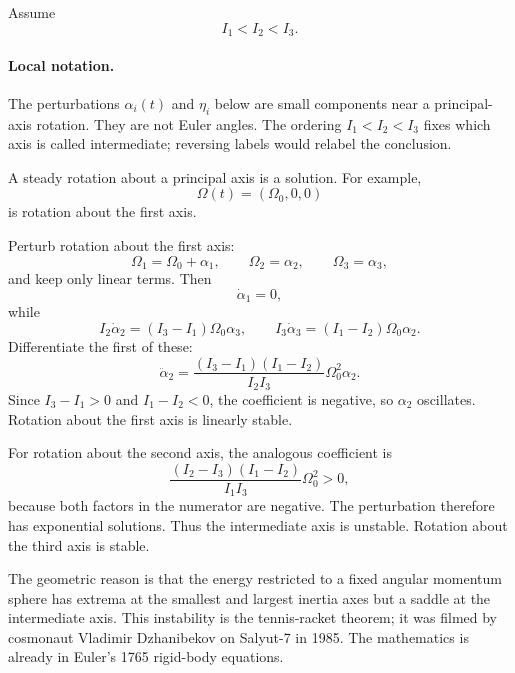 Assume
\[
  I_1<I_2<I_3.
\]

\paragraph{Local notation.}
The perturbations \(\alpha_i(t)\) and \(\eta_i\) below are small components
near a principal-axis rotation.  They are not Euler angles.  The ordering
\(I_1<I_2<I_3\) fixes which axis is called intermediate; reversing labels
would relabel the conclusion.

A steady rotation about a principal axis is a solution. For example,
\[
  \Omega(t)=(\Omega_0,0,0)
\]
is rotation about the first axis.

\begin{derivation}
Perturb rotation about the first axis:
\[
  \Omega_1=\Omega_0+\alpha_1,\qquad
  \Omega_2=\alpha_2,\qquad
  \Omega_3=\alpha_3,
\]
and keep only linear terms. Then
\[
  \dot\alpha_1=0,
\]
while
\[
  I_2\dot\alpha_2=(I_3-I_1)\Omega_0\alpha_3,
  \qquad
  I_3\dot\alpha_3=(I_1-I_2)\Omega_0\alpha_2.
\]
Differentiate the first of these:
\[
  \ddot\alpha_2
  =
  \frac{(I_3-I_1)(I_1-I_2)}{I_2I_3}\Omega_0^2\alpha_2.
\]
Since \(I_3-I_1>0\) and \(I_1-I_2<0\), the coefficient is negative, so
\(\alpha_2\) oscillates. Rotation about the first axis is linearly stable.

For rotation about the second axis, the analogous coefficient is
\[
  \frac{(I_2-I_3)(I_1-I_2)}{I_1I_3}\Omega_0^2>0,
\]
because both factors in the numerator are negative. The perturbation therefore
has exponential solutions. Thus the intermediate axis is unstable. Rotation
about the third axis is stable.
\end{derivation}

The geometric reason is that the energy restricted to a fixed angular momentum
sphere has extrema at the smallest and largest inertia axes but a saddle at the
intermediate axis.
This instability is the tennis-racket theorem; it was filmed by cosmonaut
Vladimir Dzhanibekov on Salyut-7 in 1985. The mathematics is already in
Euler's 1765 rigid-body equations.


